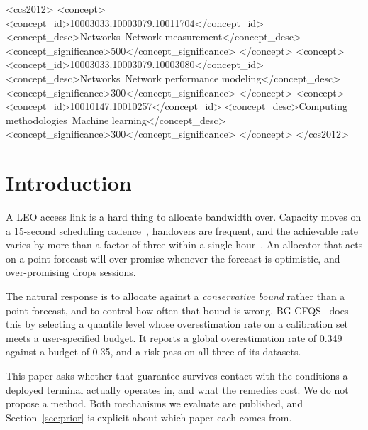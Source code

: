 \documentclass[acmsmall,screen]{acmart}
\begin{document}
\begin{CCSXML}
<ccs2012>
   <concept>
       <concept_id>10003033.10003079.10011704</concept_id>
       <concept_desc>Networks~Network measurement</concept_desc>
       <concept_significance>500</concept_significance>
   </concept>
   <concept>
       <concept_id>10003033.10003079.10003080</concept_id>
       <concept_desc>Networks~Network performance modeling</concept_desc>
       <concept_significance>300</concept_significance>
   </concept>
   <concept>
       <concept_id>10010147.10010257</concept_id>
       <concept_desc>Computing methodologies~Machine learning</concept_desc>
       <concept_significance>300</concept_significance>
   </concept>
</ccs2012>
\end{CCSXML}



\maketitle

\section{Introduction}

A LEO access link is a hard thing to allocate bandwidth over. Capacity moves on a 15-second scheduling cadence~\cite{tanveer2023constellations,casparsen2026latency}, handovers are frequent, and the achievable rate varies by more than a factor of three within a single hour~\cite{liu2025starnet}. An allocator that acts on a point forecast will over-promise whenever the forecast is optimistic, and over-promising drops sessions.

The natural response is to allocate against a \emph{conservative bound} rather than a point forecast, and to control how often that bound is wrong. BG-CFQS~\cite{xie2026bgcfqs} does this by selecting a quantile level whose overestimation rate on a calibration set meets a user-specified budget. It reports a global overestimation rate of 0.349 against a budget of 0.35, and a risk-pass on all three of its datasets.

This paper asks whether that guarantee survives contact with the conditions a deployed terminal actually operates in, and what the remedies cost. We do not propose a method. Both mechanisms we evaluate are published, and Section~\ref{sec:prior} is explicit about which paper each comes from.
\end{document}
